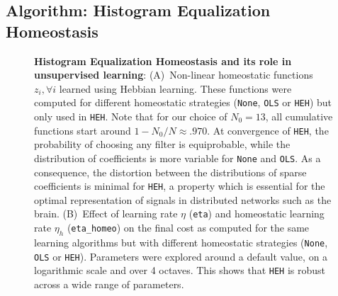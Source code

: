 \documentclass[letterpaper,final,conference,10pt]{IEEEtran}
\newcommand{\seeFig}[1]{Figure~\ref{fig:#1}}%
\begin{document}
\subsection{Algorithm: Histogram Equalization Homeostasis}\label{HEH}
\begin{figure}%
\caption{
{\bf Histogram Equalization Homeostasis and its role in unsupervised learning}:
{\sf (A)}~Non-linear homeostatic functions $z_i, \forall i$ learned using Hebbian learning. These functions were computed for different homeostatic strategies (\texttt{None}, \texttt{OLS} or \texttt{HEH}) but only used in \texttt{HEH}. Note that for our choice of $N_0=13$, all cumulative functions start around $1 - N_0/N \approx .970 $. At convergence of \texttt{HEH}, the probability of choosing any filter is equiprobable, while the distribution of coefficients is more variable for \texttt{None} and \texttt{OLS}. As a consequence, the distortion between the distributions of sparse coefficients is minimal for \texttt{HEH}, a property which is essential for the optimal representation of signals in distributed networks such as the brain. %
{\sf (B)}~Effect of learning rate $\eta$ (\texttt{eta}) and homeostatic learning rate $\eta_h$ (\texttt{eta\_homeo}) on the final cost as computed for the same learning algorithms but with different homeostatic strategies (\texttt{None}, \texttt{OLS} or \texttt{HEH}). Parameters were explored around a default value, on a logarithmic scale and over 4 octaves. This shows that \texttt{HEH} is robust across a wide range of parameters.
}
\end{figure}
\end{document}
